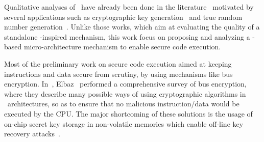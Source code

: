 



Qualitative analyses of \pufs~have already been done in the literature~\cite{Katzenbeisser2012} motivated by several applications such as cryptographic key generation~\cite{Suh2007, Bhargava2014} and true random number generation~\cite{Leest2012, Herrewege2013}. Unlike those works, which aim at evaluating the quality of a standalone \puf-inspired mechanism, this work focus on proposing and analyzing a \puf-based micro-architecture mechanism to enable secure code execution. %

Most of the preliminary work on secure code execution aimed at keeping instructions and data secure from scrutiny, by using mechanisms like bus encryption. In~\cite{Elbaz2005}, Elbaz \etal~performed a comprehensive survey of bus encryption, where they describe many possible ways of using cryptographic algorithms in \soc~architectures, so as to ensure that no malicious instruction\slash{}data would be executed by the CPU. The major shortcoming of these solutions is the usage of on-chip secret key storage in non-volatile memories which enable off-line key recovery attacks~\cite{towardshardwaresecurity2010}.

